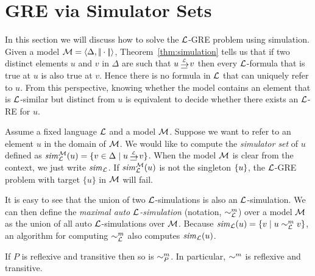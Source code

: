\section{GRE via Simulator Sets}\label{sec:simulation}

In this section we will discuss how to solve the $\mathcal{L}$-GRE problem
using simulation. Given a model $\mathcal{M} = \langle \Delta,
|\!|\cdot|\!|\rangle$, Theorem~\ref{thm:simulation} tells us that if two
distinct elements $u$ and $v$ in $\Delta$ are such that $u
\simul{\+L} v$ then every $\mathcal{L}$-formula that is true at $u$ is also
true at $v$. Hence there is no formula in $\mathcal{L}$ that can uniquely
refer to $u$. From this perspective, knowing whether the model
contains an element that is $\mathcal{L}$-similar but distinct from $u$ is
equivalent to decide whether there exists an $\mathcal{L}$-RE for $u$.


Assume a fixed language $\mathcal{L}$ and a model $\mathcal{M}$.  Suppose we want to
refer to an element $u$ in the domain of $\mathcal{M}$. We would like to
compute the \emph{simulator set} of $u$ defined as
$\simset_{\+L}^{\+M}(u) = \cset{v \in \Delta \mid u \simul{\+L} v}$.
When the model $\mathcal{M}$ is clear from the context, we just write
${\it sim}_{\mathcal{L}}$.
 If ${\it sim}_{\mathcal{L}}^{\mathcal{M}}(u)$ is not the singleton $\{u\}$,
the $\mathcal{L}$-GRE problem with target $\{u\}$ in $\mathcal{M}$ will fail.

\iffullversion
It is easy to see that the union of two $\mathcal{L}$-simulations is
also an $\mathcal{L}$-simulation. We can then define the \emph{maximal
auto $\mathcal{L}$-simulation} (notation, $\sim^m_{\mathcal{L}}$) over a model $\mathcal{M}$ as the union of all
auto $\mathcal{L}$-simulations over $\mathcal{M}$. Because
${\it sim}_{\mathcal{L}}(u) = \{v \mid u \sim^m_{\mathcal{L}} v\}$, an algorithm
for computing $\sim^m_{\mathcal{L}}$ also computes ${\it sim}_{\mathcal{L}}(u)$.
\else
\fi

\iffullversion
If $P$ is reflexive and transitive then so is $\sim^m_P$. In
particular, $\sim^m$ is reflexive and transitive.
\else
\fi



